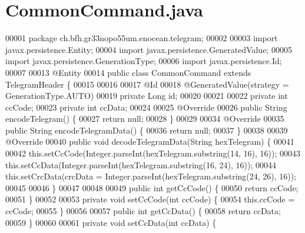 \section{Common\+Command.\+java}
\label{CommonCommand_8java_source}

\begin{DoxyCode}
00001 \textcolor{keyword}{package }ch.bfh.gr33nopo55um.enocean.telegram;
00002 
00003 \textcolor{keyword}{import} javax.persistence.Entity;
00004 \textcolor{keyword}{import} javax.persistence.GeneratedValue;
00005 \textcolor{keyword}{import} javax.persistence.GenerationType;
00006 \textcolor{keyword}{import} javax.persistence.Id;
00007 
00013 @Entity
00014 \textcolor{keyword}{public} \textcolor{keyword}{class }CommonCommand \textcolor{keyword}{extends} TelegramHeader \{
00015 
00016 
00017     @Id
00018     @GeneratedValue(strategy = GenerationType.AUTO)
00019     private Long \textcolor{keywordtype}{id};
00020 
00021 
00022     private \textcolor{keywordtype}{int} ccCode;
00023     private \textcolor{keywordtype}{int} ccData;
00024 
00025     @Override
00026     public String encodeTelegram() \{
00027         \textcolor{keywordflow}{return} null;
00028     \}
00029 
00034     @Override
00035     \textcolor{keyword}{public} String encodeTelegramData() \{
00036         \textcolor{keywordflow}{return} null;
00037     \}
00038 
00039     @Override
00040     \textcolor{keyword}{public} \textcolor{keywordtype}{void} decodeTelegramData(String hexTelegram) \{
00041 
00042         this.setCcCode(Integer.parseInt(hexTelegram.substring(14, 16), 16));
00043         this.setCcData(Integer.parseInt(hexTelegram.substring(16, 24), 16));
00044         this.setCrcData(crcData = Integer.parseInt(hexTelegram.substring(24, 26), 16));
00045 
00046     \}
00047 
00048 
00049     \textcolor{keyword}{public} \textcolor{keywordtype}{int} getCcCode() \{
00050         \textcolor{keywordflow}{return} ccCode;
00051     \}
00052 
00053     \textcolor{keyword}{private} \textcolor{keywordtype}{void} setCcCode(\textcolor{keywordtype}{int} ccCode) \{
00054         this.ccCode = ccCode;
00055     \}
00056 
00057     \textcolor{keyword}{public} \textcolor{keywordtype}{int} getCcData() \{
00058         \textcolor{keywordflow}{return} ccData;
00059     \}
00060 
00061     \textcolor{keyword}{private} \textcolor{keywordtype}{void} setCcData(\textcolor{keywordtype}{int} ccData) \{

\end{DoxyCode}
